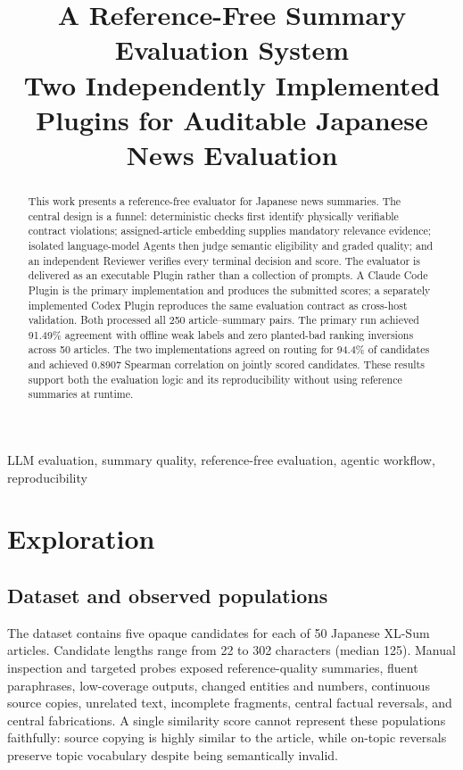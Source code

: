 \documentclass[conference]{IEEEtran}
\title{A Reference-Free Summary Evaluation System\\
\large Two Independently Implemented Plugins for Auditable Japanese News Evaluation}
\author{\IEEEauthorblockN{Chen Jinhua}
\IEEEauthorblockA{AI Quality Scientist Take-Home Assignment\\50 articles, 250 candidate summaries}}
\begin{document}
\maketitle

\begin{abstract}
This work presents a reference-free evaluator for Japanese news summaries. The central design is a funnel: deterministic checks first identify physically verifiable contract violations; assigned-article embedding supplies mandatory relevance evidence; isolated language-model Agents then judge semantic eligibility and graded quality; and an independent Reviewer verifies every terminal decision and score. The evaluator is delivered as an executable Plugin rather than a collection of prompts. A Claude Code Plugin is the primary implementation and produces the submitted scores; a separately implemented Codex Plugin reproduces the same evaluation contract as cross-host validation. Both processed all 250 article--summary pairs. The primary run achieved 91.49\% agreement with offline weak labels and zero planted-bad ranking inversions across 50 articles. The two implementations agreed on routing for 94.4\% of candidates and achieved 0.8907 Spearman correlation on jointly scored candidates. These results support both the evaluation logic and its reproducibility without using reference summaries at runtime.
\end{abstract}

\begin{IEEEkeywords}
LLM evaluation, summary quality, reference-free evaluation, agentic workflow, reproducibility
\end{IEEEkeywords}

\section{Exploration}
\subsection{Dataset and observed populations}
The dataset contains five opaque candidates for each of 50 Japanese XL-Sum articles. Candidate lengths range from 22 to 302 characters (median 125). Manual inspection and targeted probes exposed reference-quality summaries, fluent paraphrases, low-coverage outputs, changed entities and numbers, continuous source copies, unrelated text, incomplete fragments, central factual reversals, and central fabrications. A single similarity score cannot represent these populations faithfully: source copying is highly similar to the article, while on-topic reversals preserve topic vocabulary despite being semantically invalid.
\end{document}

